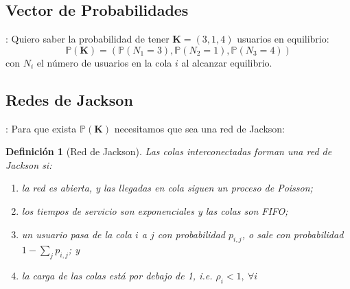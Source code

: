 \documentclass[xcolor={x11names}]{beamer}
\newtheorem{definicion}{Definición}[section]
\begin{document}
\subsection{Vector de Probabilidades}
\begin{frame}{\secname: \subsecname}
    Quiero saber la probabilidad de tener
    $\mathbf{K}=(3,1,4)$ usuarios en
    equilibrio:
    \begin{equation*}
        \mathbb{P}(\mathbf{K})=
        \left(\mathbb{P}(N_1=3),
        \mathbb{P}(N_2=1),
        \mathbb{P}(N_3=4)\right)
    \end{equation*}
    con $N_i$ el número de usuarios en la
    cola $i$ al alcanzar equilibrio.

    \vfill

    \begin{figure}
        \resizebox{.7\textwidth}{!}{%
            
        }
    \end{figure}
\end{frame}




\subsection{Redes de Jackson}
\begin{frame}{\secname: \subsecname}
    Para que exista $\mathbb{P}(\mathbf{K})$
    necesitamos que sea una red de Jackson:

    \vfill

    \begin{definicion}[Red de Jackson]
        Las colas interconectadas forman una
        red de Jackson si:
        \begin{enumerate}
            \item la red es abierta, y las
                llegadas en cola
                siguen un proceso de Poisson;
            \item los tiempos de servicio son
                exponenciales y las colas
                son FIFO;
            \item un usuario pasa de la
                cola $i$ a $j$ con probabilidad
                $p_{i,j}$, o sale con
                probabilidad
                $1-\sum_{j}p_{i,j}$; y
            \item la carga de las colas está
                por debajo de 1, i.e.
                $\rho_i<1,\ \forall i$
        \end{enumerate}
    \end{definicion}
\end{frame}
\end{document}
